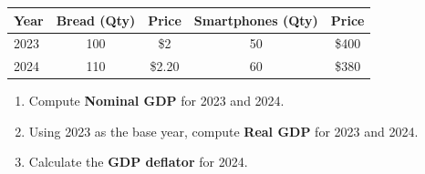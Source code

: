 \documentclass[12pt]{article}
\begin{document}
\begin{enumerate}
\begin{center}
\begin{tabular}{lcccc}
\toprule
Year & Bread (Qty) & Price & Smartphones (Qty) & Price \\
\midrule
2023 & 100 & \$2 & 50 & \$400 \\
2024 & 110 & \$2.20 & 60 & \$380 \\
\bottomrule
\end{tabular}
\end{center}

\begin{enumerate}[label=(\alph*)]
    \item Compute \textbf{Nominal GDP} for 2023 and 2024.  
    \item Using 2023 as the base year, compute \textbf{Real GDP} for 2023 and 2024.  
    \item Calculate the \textbf{GDP deflator} for 2024.  
\end{enumerate}

\end{enumerate}
\end{document}
